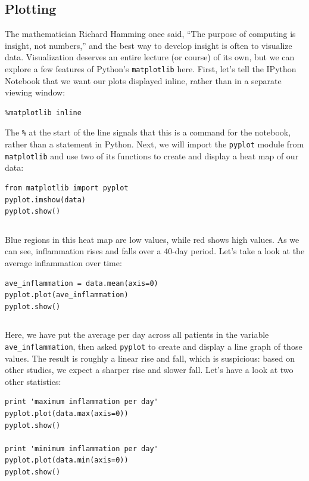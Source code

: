 \documentclass{book}
\begin{document}
\subsection{Plotting}

The mathematician Richard Hamming once said, ``The purpose of computing
is insight, not numbers,'' and the best way to develop insight is often
to visualize data. Visualization deserves an entire lecture (or course)
of its own, but we can explore a few features of Python's
\texttt{matplotlib} here. First, let's tell the IPython Notebook that we
want our plots displayed inline, rather than in a separate viewing
window:

\begin{verbatim}
%matplotlib inline
\end{verbatim}

The \texttt{\%} at the start of the line signals that this is a command
for the notebook, rather than a statement in Python. Next, we will
import the \texttt{pyplot} module from \texttt{matplotlib} and use two
of its functions to create and display a heat map of our data:

\begin{verbatim}
from matplotlib import pyplot
pyplot.imshow(data)
pyplot.show()
\end{verbatim}

\begin{verbatim}
\end{verbatim}

Blue regions in this heat map are low values, while red shows high
values. As we can see, inflammation rises and falls over a 40-day
period. Let's take a look at the average inflammation over time:

\begin{verbatim}
ave_inflammation = data.mean(axis=0)
pyplot.plot(ave_inflammation)
pyplot.show()
\end{verbatim}

\begin{verbatim}
\end{verbatim}

Here, we have put the average per day across all patients in the
variable \texttt{ave\_inflammation}, then asked \texttt{pyplot} to
create and display a line graph of those values. The result is roughly a
linear rise and fall, which is suspicious: based on other studies, we
expect a sharper rise and slower fall. Let's have a look at two other
statistics:

\begin{verbatim}
print 'maximum inflammation per day'
pyplot.plot(data.max(axis=0))
pyplot.show()

print 'minimum inflammation per day'
pyplot.plot(data.min(axis=0))
pyplot.show()
\end{verbatim}
\end{document}
